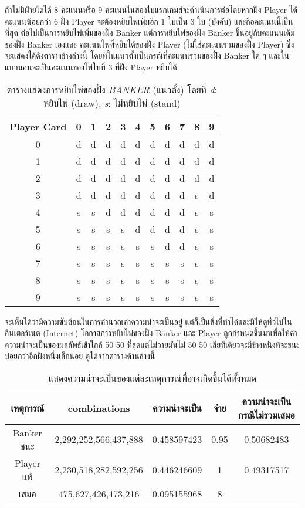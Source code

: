 \documentclass[12pt]{article}
\begin{document}
ถ้าไม่มีฝ่ายใดได้ 8 คะแนนหรือ 9 คะแนนในสองใบแรกเกมส์จะดำเนินการต่อโดยหากฝั่ง Player ได้คะแนนน้อยกว่า 6 ฝั่ง Player จะต้องหยิบไพ่เพิ่มอีก 1 ใบเป็น 3 ใบ (บังคับ) และถือคะแนนนี้เป็นที่สุด ต่อไปเป็นการหยิบไพ่เพิ่มของฝั่ง Banker แต่การหยิบไพ่ของฝั่ง Banker ขึ้นอยู่กับคะแนนเดิมของฝั่ง Banker เองและ คะแนนไพ่ที่หยิบได้ของฝั่ง Player (ไม่ใช่คะแนนรวมของฝั่ง Player) ซึ่งจะแสดงได้ดังตารางข้างล่างนี้ โดยที่ในแนวตั้งเป็นกรณีที่คะแนนรวมของฝั่ง Banker ใด ๆ และในแนวนอนจะเป็นคะแนนของไพ่ใบที่ 3 ที่ฝั่ง Player หยิบได้

\begin{table}[htb]  
\centering
\begin{tabular}{|c|c|c|c|c|c|c|c|c|c|c|}
\hline
Player Card & 0 & 1 & 2 & 3 & 4 & 5 & 6 & 7 & 8 & 9\\
\hline  
0 & d & d & d & d & d & d & d & d & d & d\\
1 & d & d & d & d & d & d & d & d & d & d\\
2 & d & d & d & d & d & d & d & d & d & d\\
3 & d & d & d & d & d & d & d & d & s & d\\
4 & s & s & d & d & d & d & d & d & s & s\\
5 & s & s & s & s & d & d & d & d & s & s\\
6 & s & s & s & s & s & s & d & d & s & s\\
7 & s & s & s & s & s & s & s & s & s & s\\
8 & s & s & s & s & s & s & s & s & s & s\\
9 & s & s & s & s & s & s & s & s & s & s\\
\hline

\end{tabular}
\caption{ตารางแสดงการหยิบไพ่ของฝั่ง \emph{BANKER} (แนวตั้ง) โดยที่  \emph{d}: หยิบไพ่ (draw), \emph{s}: ไม่หยิบไพ่ (stand)}
\end{table}

จะเห็นได้ว่ามีความซับซ้อนในการคำนวณค่าความน่าจะเป็นอยู่ แต่ก็เป็นสิ่งที่ทำได้และมีให้ดูทั่วไปในอินเตอร์เนต (Internet) โอกาสการหยิบไพ่ของฝั่ง Banker และ Player ถูกกำหนดขึ้นมาเพื่อให้ค่าความน่าจะเป็นของผลลัพธ์เข้าใกล้ 50-50 ที่สุดแต่ไม่วายมันไม่ 50-50 เสียทีเดียวจะมีข้างหนึ่งที่จะชนะบ่อยกว่าอีกฝั่งหนึ่งเล็กน้อย ดูได้จากตารางด้านล่างนี้

\begin{table}[htb]
\centering
\begin{tabular}{|c|c|c|c|c|}
\hline
เหตุการณ์ & combinations & ความน่าจะเป็น & จ่าย & ความน่าจะเป็นกรณีไม่รวมเสมอ\\
\hline
Banker ชนะ & 2,292,252,566,437,888 & 0.458597423 & 0.95 & 0.50682483\\
Player แพ้ & 2,230,518,282,592,256 & 0.446246609 & 1 & 0.49317517\\
เสมอ & 475,627,426,473,216 & 0.095155968 & 8 & \\
\hline
\end{tabular}
\caption{แสดงความน่าจะเป็นของแต่ละเหตุการณ์ที่อาจเกิดขึ้นได้ทั้งหมด}
\end{table}
\end{document}
